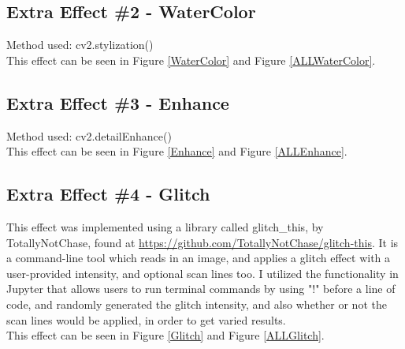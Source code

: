 \documentclass[a4paper,10pt]{report}
\begin{document}
	
	\subsection{Extra Effect \#2 - WaterColor}
	Method used: cv2.stylization()\\
	This effect can be seen in Figure \ref{WaterColor} and Figure \ref{ALLWaterColor}.
	\subsection{Extra Effect \#3 - Enhance}
	Method used: cv2.detailEnhance()\\
	This effect can be seen in Figure \ref{Enhance} and Figure \ref{ALLEnhance}.
	\subsection{Extra Effect \#4 - Glitch}
	This effect was implemented using a library called glitch\_this, by TotallyNotChase, found at \url{https://github.com/TotallyNotChase/glitch-this}. It is a command-line tool which reads in an image, and applies a glitch effect with a user-provided intensity, and optional scan lines too. I utilized the functionality in Jupyter that allows users to run terminal commands by using "!" before a line of code, and randomly generated the glitch intensity, and also whether or not the scan lines would be applied, in order to get varied results.\\
	This effect can be seen in Figure \ref{Glitch} and Figure \ref{ALLGlitch}.
	
\end{document}

